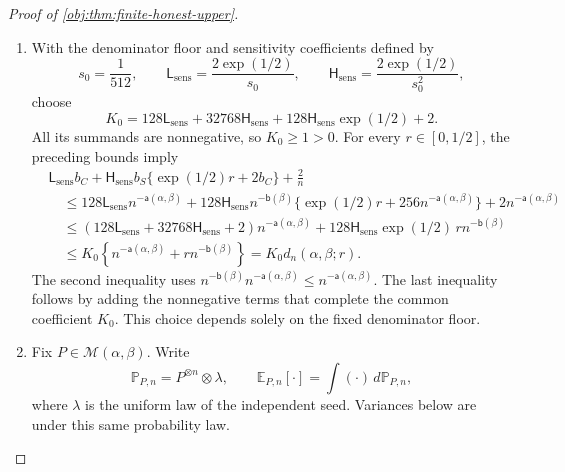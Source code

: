 \documentclass[11pt]{article}
\begin{document}
\begin{proof}[Proof of \cref{obj:thm:finite-honest-upper}]
\begin{enumerate}
\item With the denominator floor and sensitivity coefficients defined by
\[
s_0=\frac1{512},
\qquad
\mathsf L_{\mathrm{sens}}=\frac{2\exp(1/2)}{s_0},
\qquad
\mathsf H_{\mathrm{sens}}=\frac{2\exp(1/2)}{s_0^2},
\]
choose
\[
K_0
=
128\mathsf L_{\mathrm{sens}}
+32768\mathsf H_{\mathrm{sens}}
+128\mathsf H_{\mathrm{sens}}\exp(1/2)+2.
\]
All its summands are nonnegative, so \(K_0\ge1>0\).
For every \(r\in[0,1/2]\), the preceding bounds imply
\[
\begin{aligned}
&\mathsf L_{\mathrm{sens}}b_C
+\mathsf H_{\mathrm{sens}}b_S
   \{\exp(1/2)r+2b_C\}
+\frac2n\\
&\quad\le
128\mathsf L_{\mathrm{sens}}n^{-\mathsf a(\alpha,\beta)}
+128\mathsf H_{\mathrm{sens}}n^{-\mathsf b(\beta)}
 \{\exp(1/2)r+256n^{-\mathsf a(\alpha,\beta)}\}
+2n^{-\mathsf a(\alpha,\beta)}\\
&\quad\le
(128\mathsf L_{\mathrm{sens}}
 +32768\mathsf H_{\mathrm{sens}}+2)
 n^{-\mathsf a(\alpha,\beta)}
+
128\mathsf H_{\mathrm{sens}}\exp(1/2)\,
r n^{-\mathsf b(\beta)}\\
&\quad\le
K_0\left\{
n^{-\mathsf a(\alpha,\beta)}
+r n^{-\mathsf b(\beta)}
\right\}
=
K_0d_n(\alpha,\beta;r).
\end{aligned}
\]
The second inequality uses
\(n^{-\mathsf b(\beta)}n^{-\mathsf a(\alpha,\beta)}
\le n^{-\mathsf a(\alpha,\beta)}\).
The last inequality follows by adding the nonnegative terms that complete the common coefficient \(K_0\).
This choice depends solely on the fixed denominator floor.

\item Fix \(P\in\mathcal M(\alpha,\beta)\). Write
\[
\mathbb P_{P,n}=P^{\otimes n}\otimes\lambda,
\qquad
\mathbb E_{P,n}[\cdot]=\int(\cdot)\,d\mathbb P_{P,n},
\]
where \(\lambda\) is the uniform law of the independent seed. Variances below are under this same probability law.


\end{enumerate}
\end{proof}
\end{document}
